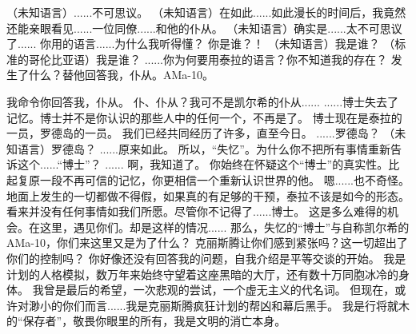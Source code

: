 \documentclass[openany]{book}
\begin{document}
\begin{dialogue}
     （未知语言）......不可思议。
     （未知语言）在如此......如此漫长的时间后，我竟然还能亲眼看见......一位同僚......和他的仆从。
     （未知语言）确实是......太不可思议了......
     你用的语言......为什么我听得懂？
     你是谁？！
     （未知语言）我是谁？
     （标准的哥伦比亚语）我是谁？
     ......你为何要用泰拉的语言？你不知道我的存在？
     发生了什么？替他回答我，仆从。AMa-10。
\end{dialogue}

\begin{dialogue}
     我命令你回答我，仆从。
     仆、仆从？我可不是凯尔希的仆从......
     ......博士失去了记忆。博士并不是你认识的那些人中的任何一个，不再是了。
     博士现在是泰拉的一员，罗德岛的一员。
     我们已经共同经历了许多，直至今日。
     ......罗德岛？
     （未知语言）罗德岛？
     ......原来如此。
     所以，“失忆”。为什么你不把所有事情重新告诉这个......“博士”？
     ......
     啊，我知道了。
     你始终在怀疑这个“博士”的真实性。比起复原一段不再可信的记忆，你更相信一个重新认识世界的他。
     嗯......也不奇怪。地面上发生的一切都做不得假，如果真的有足够的干预，泰拉不该是如今的形态。
     看来并没有任何事情如我们所愿。尽管你不记得了......博士。
     这是多么难得的机会。在这里，遇见你们。却是这样的情况......
     那么，失忆的“博士”与自称凯尔希的AMa-10，你们来这里又是为了什么？
     克丽斯腾让你们感到紧张吗？这一切超出了你们的控制吗？
     你好像还没有回答我的问题，自我介绍是平等交谈的开始。
     我是计划的人格模拟，数万年来始终守望着这座黑暗的大厅，还有数十万同胞冰冷的身体。
     我曾是最后的希望，一次悲观的尝试，一个虚无主义的代名词。
     但现在，或许对渺小的你们而言......我是克丽斯腾疯狂计划的帮凶和幕后黑手。
     我是行将就木的“保存者”，敬畏你眼里的所有，我是文明的消亡本身。
\end{dialogue}
\end{document}
